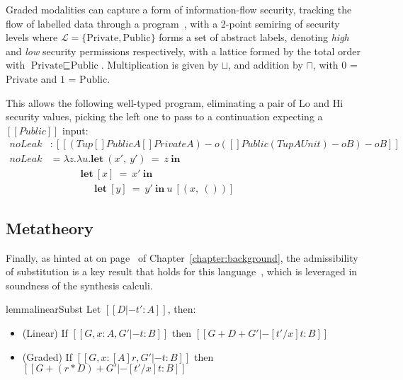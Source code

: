\begin{example}%
\label{exm:security}
%
Graded modalities can capture a form of information-flow security, tracking the
flow of labelled data through a
program~\citep{DBLP:journals/pacmpl/OrchardLE19}, with a 2-point semiring of
security levels where $\mathcal{L} = \{ \text{Private}, \text{Public} \}$ forms a set of
abstract labels, denoting \emph{high} and \emph{low} security permissions
respectively, with a lattice formed by the total order with $\text{Private} \sqsubseteq \text{Public}$.
Multiplication is given by $\sqcup$, and addition by $\sqcap$, with $0$ = $\text{Private}$
and $1$ = $\text{Public}$. 

This allows the following well-typed program, eliminating a pair of $\text{Lo}$
and $\text{Hi}$ security values, picking the left one to pass to a continuation
expecting a $[[ Public ]]$ input:
%
\begin{align*}
\textit{noLeak} & : [[ (Tup {[] Public A} {[] Private A}) -o {({[]
                  Public (Tup A Unit)} -o B) -o B} ]] \\
\textit{noLeak} & = \lambda z . \lambda u . \textbf{let}\ (x',\ y')\ =\ z\ \textbf{in}\ \\
                & \;\;\;\;\;\;\;\;\;\;\; \textbf{let}\ [x]\ =\ x'\ \textbf{in}\ \\ 
                & \;\;\;\;\;\;\;\;\;\;\;\;\;\;\;\; \textbf{let}\ [y]\ =\ y'\ \textbf{in}\ u\ [(x,\ ())]
\end{align*}
\end{example}

\subsection{Metatheory}
Finally, as hinted at on page~\pageref{ref:substitution} of
Chapter~\ref{chapter:background}, the admissibility of substitution is a key
result that holds for this language~\citep{DBLP:journals/pacmpl/OrchardLE19},
which is leveraged in soundness of the synthesis calculi.
%
\begin{restatable}{lemma}{linearSubst}
Let $[[ D |- t' : A]]$, then:
\label{lemma:substitution}
\begin{itemize}[leftmargin=1em]
\item (Linear) \hspace{0.04em} If $[[ {G, x : A}
    , { G' } |- t : B]]$ then $[[ G + D + G' |-
[ t' / x ] t : B ]]$
\item (Graded) If $[[ {G, x : [A] r} , { G' } |- t : B]]$
then $[[ G + (r * D) + G' |- [ t' / x ] t : B ]]$
\end{itemize}
\end{restatable}


